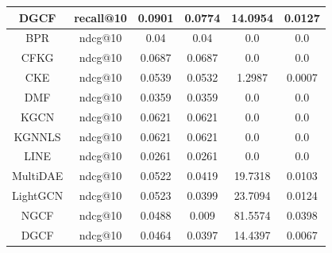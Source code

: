 \begin{table}[H]
{\begin{tabular}{|c|c|c|c|c| c|}
            DGCF             & recall@10         & 0.0901                            & 0.0774                         & 14.0954                     & 0.0127                      \\ \hline
            BPR              & ndcg@10           & 0.04                              & 0.04                           & 0.0                         & 0.0                         \\ \hline
            CFKG             & ndcg@10           & 0.0687                            & 0.0687                         & 0.0                         & 0.0                         \\ \hline
            CKE              & ndcg@10           & 0.0539                            & 0.0532                         & 1.2987                      & 0.0007                      \\ \hline
            DMF              & ndcg@10           & 0.0359                            & 0.0359                         & 0.0                         & 0.0                         \\ \hline
            KGCN             & ndcg@10           & 0.0621                            & 0.0621                         & 0.0                         & 0.0                         \\ \hline
            KGNNLS           & ndcg@10           & 0.0621                            & 0.0621                         & 0.0                         & 0.0                         \\ \hline
            LINE             & ndcg@10           & 0.0261                            & 0.0261                         & 0.0                         & 0.0                         \\ \hline
            MultiDAE         & ndcg@10           & 0.0522                            & 0.0419                         & 19.7318                     & 0.0103                      \\ \hline
            LightGCN         & ndcg@10           & 0.0523                            & 0.0399                         & 23.7094                     & 0.0124                      \\ \hline
            NGCF             & ndcg@10           & 0.0488                            & 0.009                          & 81.5574                     & 0.0398                      \\ \hline
            DGCF             & ndcg@10           & 0.0464                            & 0.0397                         & 14.4397                     & 0.0067                      \\ \hline

\end{tabular}}
\end{table}
